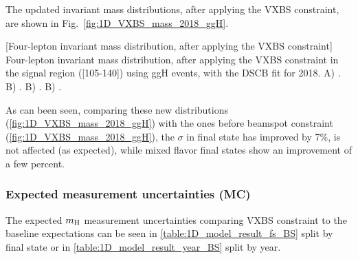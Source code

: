 The updated invariant mass distributions, after applying the VXBS constraint, are shown in Fig.~\ref{fig:1D_VXBS_mass_2018_ggH}.
\begin{multiFigure}
    \centering
        [Four-lepton invariant mass distribution, after applying the VXBS constraint]
        {Four-lepton invariant mass distribution, after applying the VXBS constraint in the signal region ([105-140]\GeV) using ggH events, with the DSCB fit for 2018.
        \;A) \fourmu.    %
        \;B) \foure.
        \;B) \twoetwomu.
        \;B) \twomutwoe.}
    \label{fig:1D_VXBS_mass_2018_ggH}
\end{multiFigure}
As can been seen, comparing these new distributions (\cref{fig:1D_VXBS_mass_2018_ggH}) with the ones before beamspot constraint (\cref{fig:1D_VXBS_mass_2018_ggH}), the $\sigma$ in \fourmu final state has improved by 7$\%$, \foure is not affected (as expected), while mixed flavor final states show an improvement of a few percent.

\subsubsection{Expected \mH measurement uncertainties (MC)}
The expected $m_{\mathrm{H}}$ measurement uncertainties comparing VXBS constraint to the baseline expectations can be seen in \cref{table:1D_model_result_fs_BS} split by final state or in \cref{table:1D_model_result_year_BS} split by year.

